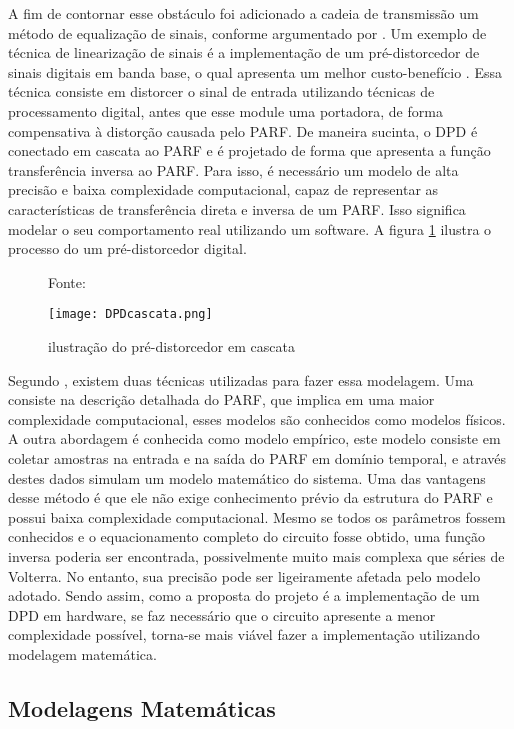 A fim de contornar esse obstáculo foi adicionado a cadeia de transmissão um método de equalização de sinais, conforme argumentado por \cite{Kenington2000}. Um exemplo de técnica de linearização de sinais é a implementação de um pré-distorcedor de sinais digitais em banda base, o qual apresenta um melhor custo-benefício \cite{Kenington2000}. Essa técnica consiste em distorcer o sinal de entrada utilizando técnicas de processamento digital, antes que esse module uma portadora, de forma compensativa à distorção causada pelo PARF. De maneira sucinta, o DPD é conectado em cascata ao PARF e é projetado de forma que apresenta a função transferência inversa ao PARF. Para isso, é necessário um modelo de alta precisão e baixa complexidade computacional, capaz de representar as características de transferência direta e inversa de um PARF. Isso significa modelar o seu comportamento real utilizando um software.  A figura \ref{fig:cascatadpd} ilustra o processo do um pré-distorcedor digital.

\begin{figure}[H]
    \centering
    \captionsetup{justification=centering}
    \caption*{Fonte: \cite{Chavez2018}}
    \texttt{[image: DPDcascata.png]}
    \caption{ilustração do pré-distorcedor em cascata}
    \label{fig:cascatadpd}
\end{figure}

Segundo \cite{John2016}, existem duas técnicas utilizadas para fazer essa modelagem. Uma consiste na descrição detalhada do PARF, que implica em uma maior complexidade computacional, esses modelos são conhecidos como modelos físicos. A outra abordagem é conhecida como modelo empírico, este modelo consiste em coletar amostras na entrada e na saída do PARF em domínio temporal, e através destes dados simulam um modelo matemático do sistema. Uma das vantagens desse método é que ele não exige conhecimento prévio da estrutura do PARF e possui baixa complexidade computacional. Mesmo se todos os parâmetros fossem conhecidos e o equacionamento completo do circuito fosse obtido, uma função inversa poderia ser encontrada, possivelmente muito mais complexa que séries de Volterra. No entanto, sua precisão pode ser ligeiramente afetada pelo modelo adotado. 
Sendo assim, como a proposta do projeto é a implementação de um DPD em hardware, se faz necessário que o circuito apresente a menor complexidade possível,  torna-se mais viável fazer a implementação utilizando modelagem matemática. 

\subsection{Modelagens Matemáticas}

